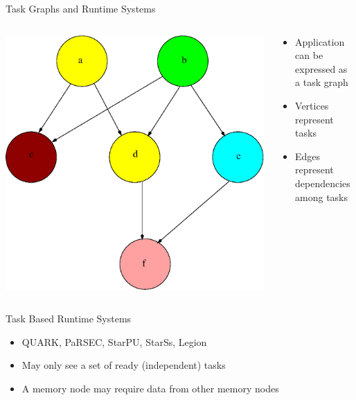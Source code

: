 \documentclass[mathserif,hyperref={pdfpagemode=FullScreen}]{beamer}
\begin{document}
\begin{frame}{Task Graphs and Runtime Systems}
		\begin{columns}
	\null \hfill
	\begin{column}{0.4\linewidth}
		\begin{center}
			\includegraphics[scale=0.2]{diagrams/taskGraph.eps}
		\end{center}
	\end{column}
	\begin{column}{0.5\linewidth}
		\begin{itemize}
			   	 \item Application can be expressed as a task graph
			   	 \item Vertices represent tasks
			   	 \item Edges represent dependencies among tasks
		\end{itemize}
	\end{column}
\end{columns}
\begin{block}{Task Based Runtime Systems}
		\begin{itemize}
	\item QUARK, PaRSEC, StarPU, StarSs, Legion
	\item May only see a set of ready (independent) tasks
	\item A memory node may require data from other memory nodes 


\end{itemize}
\end{block}
\end{frame}
\end{document}
